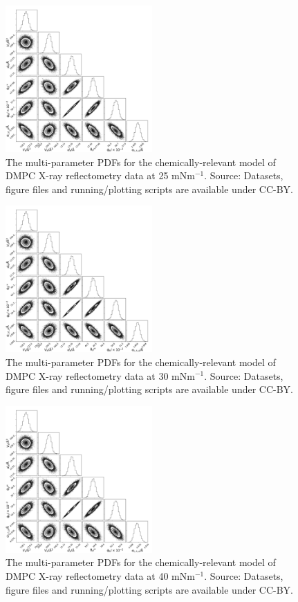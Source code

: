 \documentclass[11pt,a4paper]{article}
\begin{document}
\begin{figure}[h]
	\centering
	\includegraphics[width=0.50\textwidth]{figures/dmpc2_all_corner}
	\caption{The multi-parameter PDFs for the chemically-relevant model of DMPC X-ray reflectometry data at 25 mNm$^{-1}$. Source: Datasets, figure files and running/plotting scripts are available under CC-BY.\cite{mccluskey_2018}}
	\label{fig:dmpc3}
\end{figure}
\begin{figure}[h]
	\centering
	\includegraphics[width=0.50\textwidth]{figures/dmpc3_all_corner}
	\caption{The multi-parameter PDFs for the chemically-relevant model of DMPC X-ray reflectometry data at 30 mNm$^{-1}$. Source: Datasets, figure files and running/plotting scripts are available under CC-BY.\cite{mccluskey_2018}}
	\label{fig:dmpc4}
\end{figure}
\begin{figure}
	\centering
	\includegraphics[width=0.50\textwidth]{figures/dmpc4_all_corner}
	\caption{The multi-parameter PDFs for the chemically-relevant model of DMPC X-ray reflectometry data at 40 mNm$^{-1}$. Source: Datasets, figure files and running/plotting scripts are available under CC-BY.\cite{mccluskey_2018}}
	\label{fig:dmpc5}
\end{figure}
\end{document}
